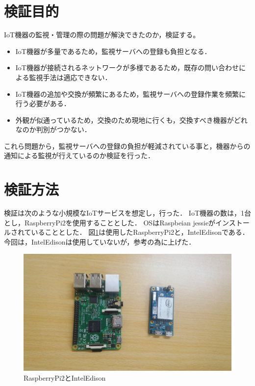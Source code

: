 \section{検証目的}
IoT機器の監視・管理の際の問題が解決できたのか，検証する。
\begin{itemize}
\item IoT機器が多量であるため，監視サーバへの登録も負担となる．
\item IoT機器が接続されるネットワークが多様であるため，既存の問い合わせによる監視手法は適応できない．
\item IoT機器の追加や交換が頻繁にあるため，監視サーバへの登録作業を頻繁に行う必要がある．
\item 外観が似通っているため，交換のため現地に行くも，交換すべき機器がどれなのか判別がつかない．
\end{itemize}
これら問題から，監視サーバへの登録の負担が軽減されている事と，機器からの通知による監視が行えているのか検証を行った．

\section{検証方法}
検証は次のような小規模なIoTサービスを想定し，行った．
IoT機器の数は，1台とし，RaspberryPi2を使用することとした．
OSはRaspbeian jessieがインストールされていることとした．
図\ref{fig:device}は使用したRaspberryPi2と，IntelEdisonである．
今回は，IntelEdisonは使用していないが，参考の為に上げた．
\begin{figure}[htbp]
\begin{center}
\includegraphics[width=14cm]{images/device.png}
\caption{RaspberryPi2とIntelEdison}
\label{fig:device}
\end{center}
\end{figure}

